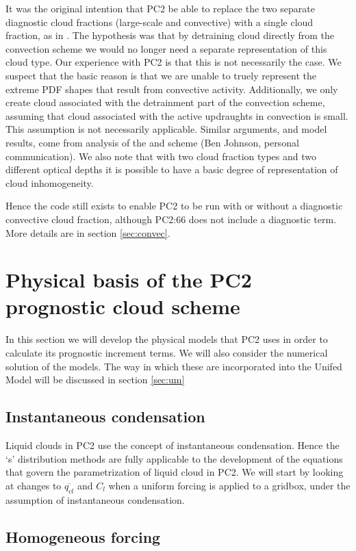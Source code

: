 \documentclass{UMDP_article}
\begin{document}
It was the original intention that PC2 be able to replace the two
separate diagnostic cloud fractions (large-scale and convective) with
a single cloud fraction, as in \cite{t93}. The hypothesis was that
by detraining cloud
directly from the convection scheme we would no longer need a separate
representation of this cloud type. Our experience with PC2 is that
this is not necessarily the case. We suspect that the basic reason is
that we are unable to truely represent the extreme PDF shapes that
result from convective activity. Additionally, we only create cloud
associated with the detrainment part of the convection scheme, assuming
that cloud associated with the active updraughts in convection is small.
This assumption is not necessarily applicable. Similar arguments,
and model results, come from analysis of the \cite{t93} and
\cite{t02} scheme (Ben Johnson, personal communication). We also note
that with two cloud fraction types and two different optical depths
it is possible to have a basic degree of representation of cloud inhomogeneity.

Hence the code still exists to enable PC2 to be
run with or without a diagnostic convective cloud fraction, although PC2:66
does not include a diagnostic term. More details are
in section \ref{sec:convec}.

\section{Physical basis of the PC2 prognostic cloud scheme}

In this section we will develop the physical models that PC2 uses in order
to calculate its prognostic increment terms. We will also consider the
numerical solution of the models. The way in which these are incorporated
into the Unifed Model will be discussed in section \ref{sec:um}

\subsection{Instantaneous condensation}

Liquid clouds in PC2 use the concept of instantaneous condensation. Hence the
`s' distribution methods are fully applicable to the development of the
equations that govern the parametrization of liquid cloud in PC2. We will
start by looking at changes to $\overline{q_{cl}}$ and $C_l$ when a
uniform forcing
is applied to a gridbox, under the assumption of instantaneous condensation.

\subsection{Homogeneous forcing}
\label{sec:homog}
\end{document}
